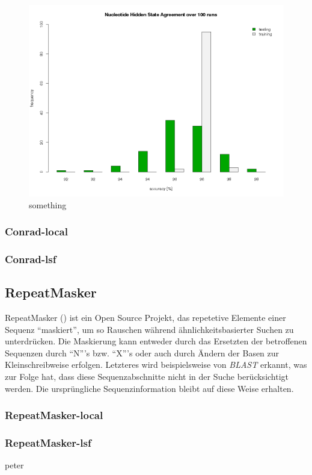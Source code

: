 \begin{figure}[ht]
	\begin{center}
		\includegraphics[scale=0.42]{pics/agree2.png}
	\caption{something}
	\end{center}
	\label{fig:stateAgreement}
\end{figure}

\subsubsection{Conrad-local}
\subsubsection{Conrad-lsf}
\subsection{RepeatMasker}
RepeatMasker
()
ist ein Open Source Projekt, das repetetive Elemente einer Sequenz
\enquote{maskiert}, um so Rauschen während ähnlichkeitsbasierter Suchen zu
unterdrücken.
Die Maskierung kann entweder durch das Ersetzten der betroffenen Sequenzen
durch \enquote{N}'s bzw. \enquote{X}'s oder auch durch Ändern der Basen zur
Kleinschreibweise erfolgen.
Letzteres wird beispielsweise von \textit{BLAST} erkannt, was zur Folge hat,
dass diese Sequenzabschnitte nicht in der Suche berücksichtigt werden.
Die ursprüngliche Sequenzinformation bleibt auf diese Weise	erhalten.
\subsubsection{RepeatMasker-local}
\subsubsection{RepeatMasker-lsf}
peter
